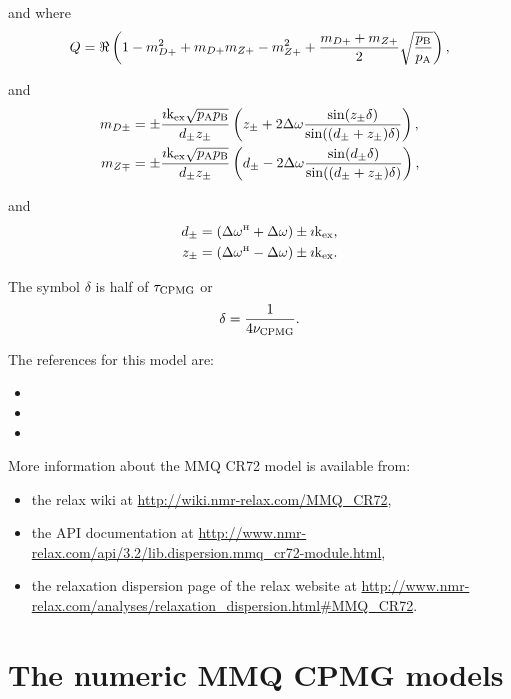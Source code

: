 and where
\begin{equation}
    Q = \Re \left( 1 - m_{D+}^2 + m_{D+} m_{Z+} - m_{Z+}^2 + \frac{m_{D+} + m_{Z+}}{2} \sqrt{\frac{p_{\textrm{B}}}{p_{\textrm{A}}}} \right),
\end{equation}

and
\begin{align}
    m_{D\pm} &= \pm \frac{\imath\textrm{k}_{\textrm{ex}}\sqrt{p_{\textrm{A}}p_{\textrm{B}}}}{d_{\pm} z_\pm} \left( z_{\pm} + 2\Delta\omega \frac{\sin(z_{\pm}\delta)}{\sin((d_{\pm} + z_{\pm})\delta)} \right), \\
    m_{Z\mp} &= \pm \frac{\imath\textrm{k}_{\textrm{ex}}\sqrt{p_{\textrm{A}}p_{\textrm{B}}}}{d_{\pm} z_\pm} \left( d_{\pm} - 2\Delta\omega \frac{\sin(d_{\pm}\delta)}{\sin((d_{\pm} + z_{\pm})\delta)} \right),
\end{align}

and
\begin{align}
    d_{\pm}    &= \left( \Delta\omega^{\scriptscriptstyle\mathrm{H}} + \Delta\omega \right) \pm \imath\textrm{k}_{\textrm{ex}}, \\
    z_{\pm}    &= \left( \Delta\omega^{\scriptscriptstyle\mathrm{H}} - \Delta\omega \right) \pm \imath\textrm{k}_{\textrm{ex}}.
\end{align}

The symbol $\delta$ is half of $\tau_{\textrm{CPMG}}$ or
\begin{equation}
    \delta = \frac{1}{4\nu_{\textrm{CPMG}}}.
\end{equation}

The references for this model are:
\begin{itemize}
  \item {}
  \item {}
  \item {}
\end{itemize}

More information about the MMQ CR72 model is available from:
\begin{itemize}
  \item the relax wiki at \url{http://wiki.nmr-relax.com/MMQ\_CR72},
  \item the API documentation at \url{http://www.nmr-relax.com/api/3.2/lib.dispersion.mmq\_cr72-module.html},
  \item the relaxation dispersion page of the relax website at \url{http://www.nmr-relax.com/analyses/relaxation\_dispersion.html#MMQ\_CR72}.
\end{itemize}




\section{The numeric MMQ CPMG models}
\label{sect: dispersion: numeric MMQ CPMG models}

